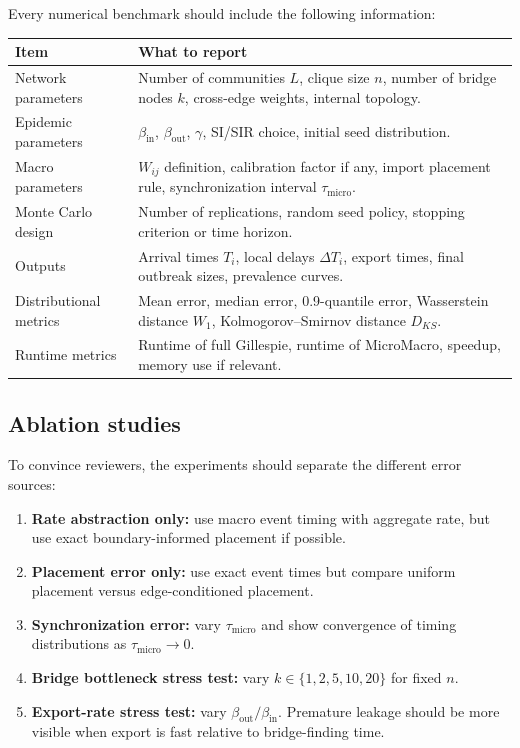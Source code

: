 \documentclass[12pt,a4paper]{article}
\theoremstyle{definition}
\newcommand{\1}{\mathbf{1}}
\begin{document}
Every numerical benchmark should include the following information:
\begin{longtable}{p{}p{}}
\toprule
\textbf{Item} & \textbf{What to report}\\
\midrule
Network parameters & Number of communities $L$, clique size $n$, number of bridge nodes $k$, cross-edge weights, internal topology.\\
Epidemic parameters & $\beta_{\mathrm{in}}$, $\beta_{\mathrm{out}}$, $\gamma$, SI/SIR choice, initial seed distribution.\\
Macro parameters & $W_{ij}$ definition, calibration factor if any, import placement rule, synchronization interval $\tau_{\mathrm{micro}}$.\\
Monte Carlo design & Number of replications, random seed policy, stopping criterion or time horizon.\\
Outputs & Arrival times $T_i$, local delays $\Delta T_i$, export times, final outbreak sizes, prevalence curves.\\
Distributional metrics & Mean error, median error, 0.9-quantile error, Wasserstein distance $W_1$, Kolmogorov--Smirnov distance $D_{KS}$.\\
Runtime metrics & Runtime of full Gillespie, runtime of MicroMacro, speedup, memory use if relevant.\\
\bottomrule
\end{longtable}

\subsection{Ablation studies}

To convince reviewers, the experiments should separate the different error sources:
\begin{enumerate}
    \item \textbf{Rate abstraction only:} use macro event timing with aggregate rate, but use exact boundary-informed placement if possible.
    \item \textbf{Placement error only:} use exact event times but compare uniform placement versus edge-conditioned placement.
    \item \textbf{Synchronization error:} vary $\tau_{\mathrm{micro}}$ and show convergence of timing distributions as $\tau_{\mathrm{micro}}\to 0$.
    \item \textbf{Bridge bottleneck stress test:} vary $k\in\{1,2,5,10,20\}$ for fixed $n$.
    \item \textbf{Export-rate stress test:} vary $\beta_{\mathrm{out}}/\beta_{\mathrm{in}}$.  Premature leakage should be more visible when export is fast relative to bridge-finding time.
\end{enumerate}
\end{document}
